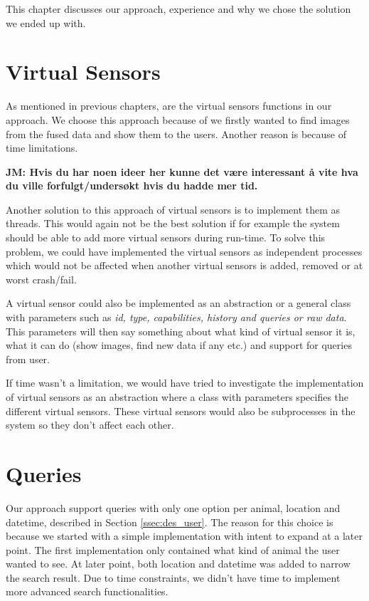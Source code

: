 \documentclass[USenglish]{uit-thesis}
\begin{document}
This chapter discusses our approach, experience and why we chose the solution we ended up with.

\section{Virtual Sensors}
As mentioned in previous chapters, are the virtual sensors functions in our approach. We choose this approach because of we firstly wanted to find images from the fused data and show them to the users. Another reason is because of time limitations.

\textbf{JM: Hvis du har noen ideer her kunne det være interessant å vite hva du ville forfulgt/undersøkt hvis du hadde mer tid.}

Another solution to this approach of virtual sensors is to implement them as threads. This would again not be the best solution if for example the system should be able to add more virtual sensors during run-time. To solve this problem, we could have implemented the virtual sensors as independent processes which would not be affected when another virtual sensors is added, removed or at worst crash/fail. 

A virtual sensor could also be implemented as an abstraction or a general class with parameters such as \textit{id, type, capabilities, history and queries or raw data}. This parameters will then say something about what kind of virtual sensor it is, what it can do (show images, find new data if any etc.) and support for queries from user.

If time wasn't a limitation, we would have tried to investigate the implementation of virtual sensors as an abstraction where a class with parameters specifies the different virtual sensors. These virtual sensors would also be subprocesses in the system so they don't affect each other. 


\section{Queries}
Our approach support queries with only one option per animal, location and datetime, described in Section \ref{ssec:des_user}. The reason for this choice is because we started with a simple implementation with intent to expand at a later point. The first implementation only contained what kind of animal the user wanted to see. At later point, both location and datetime was added to narrow the search result. Due to time constraints, we didn't have time to implement more advanced search functionalities.
\end{document}

